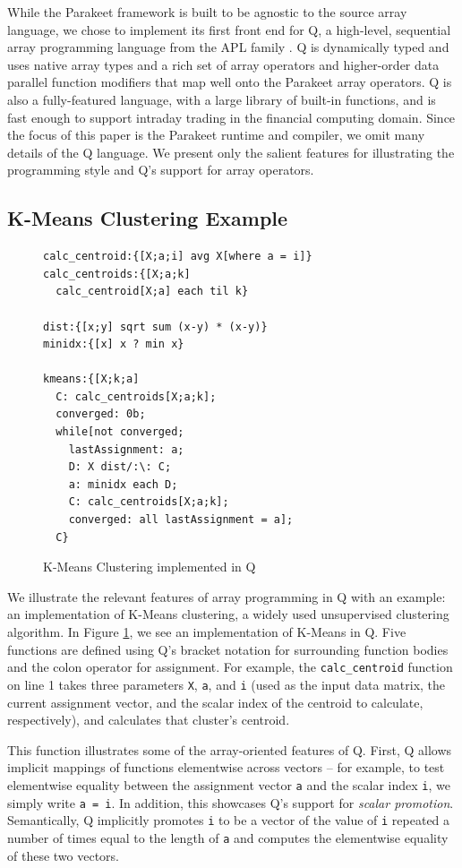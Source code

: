 \documentclass[preprint]{sigplanconf}
\begin{document}
While the Parakeet framework is built to be agnostic to the source array language, we chose to implement its first front end for Q, a high-level, sequential array programming language from the APL family \cite{Borr08}. Q is dynamically typed and uses native array types and a rich set of array operators and higher-order data parallel function modifiers that map well onto the Parakeet array operators. Q is also a fully-featured language, with a large library of built-in functions, and is fast enough to support
intraday trading in the financial computing domain. Since the focus of this paper is the Parakeet runtime and compiler, we omit many details of the Q language.  We present only the salient features for illustrating the programming style and Q's support for array operators.

\subsection{K-Means Clustering Example}
\begin{figure}[h!]
\begin{lstlisting}
calc_centroid:{[X;a;i] avg X[where a = i]}
calc_centroids:{[X;a;k]
  calc_centroid[X;a] each til k}

dist:{[x;y] sqrt sum (x-y) * (x-y)}
minidx:{[x] x ? min x}

kmeans:{[X;k;a]
  C: calc_centroids[X;a;k];
  converged: 0b;
  while[not converged;
    lastAssignment: a;
    D: X dist/:\: C;
    a: minidx each D;
    C: calc_centroids[X;a;k];
    converged: all lastAssignment = a];
  C}
\end{lstlisting}
\caption{K-Means Clustering implemented in Q}
\label{QKMeans}
\end{figure}

We illustrate the relevant features of array programming in Q with an example: an implementation of K-Means clustering, a widely used unsupervised clustering algorithm.  In Figure \ref{QKMeans}, we see an implementation of K-Means in Q.  Five functions are defined using Q's bracket notation for surrounding function bodies and the colon operator for assignment. For example, the \texttt{calc\_centroid} function on line 1 takes three parameters \texttt{X}, \texttt{a}, and \texttt{i} (used as the input data matrix, the
current assignment vector, and the scalar index of the centroid to calculate, respectively), and calculates that cluster's centroid.

This function illustrates some of the array-oriented features of Q. First, Q allows implicit mappings of functions elementwise across vectors -- for example, to test elementwise equality between the assignment
vector \texttt{a} and the scalar index \texttt{i}, we simply write \texttt{a = i}.  In addition, this showcases Q's support for \emph{scalar promotion}.  Semantically, Q implicitly promotes \texttt{i} to be a vector of the value of \texttt{i} repeated a number of times equal to the length of \texttt{a} and computes the elementwise equality of these two vectors.
\end{document}
